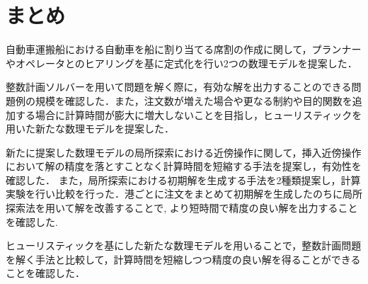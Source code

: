 \chapter{まとめ}\label{conclution}
自動車運搬船における自動車を船に割り当てる席割の作成に関して，プランナーやオペレータとのヒアリングを基に定式化を行い2つの数理モデルを提案した．

整数計画ソルバーを用いて問題を解く際に，有効な解を出力することのできる問題例の規模を確認した．また，注文数が増えた場合や更なる制約や目的関数を追加する場合に計算時間が膨大に増大しないことを目指し，ヒューリスティックを用いた新たな数理モデルを提案した．

新たに提案した数理モデルの局所探索における近傍操作に関して，挿入近傍操作において解の精度を落とすことなく計算時間を短縮する手法を提案し，有効性を確認した．
また，局所探索における初期解を生成する手法を2種類提案し，計算実験を行い比較を行った．港ごとに注文をまとめて初期解を生成したのちに局所探索法を用いて解を改善することで, より短時間で精度の良い解を出力することを確認した.

ヒューリスティックを基にした新たな数理モデルを用いることで，整数計画問題を解く手法と比較して，計算時間を短縮しつつ精度の良い解を得ることができることを確認した．
